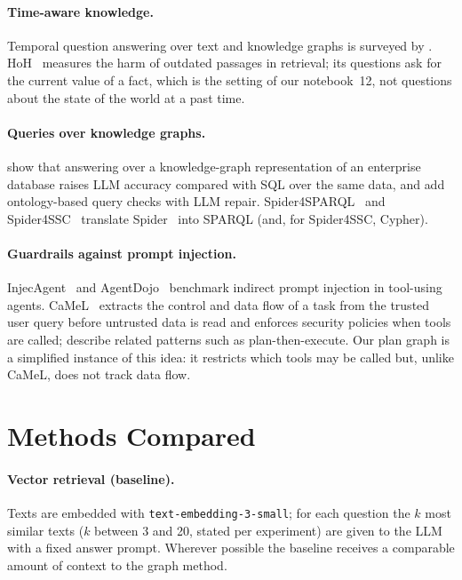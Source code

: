 \documentclass[11pt,a4paper]{article}
\begin{document}
\paragraph{Time-aware knowledge.} Temporal question answering over text and knowledge graphs is surveyed
by \citet{piryani2025temporalqa}. HoH~\cite{ouyang2025hoh} measures the harm of outdated passages in retrieval; its
questions ask for the current value of a fact, which is the setting of our notebook~12, not questions about the state
of the world at a past time.

\paragraph{Queries over knowledge graphs.} \citet{sequeda2023benchmark} show that answering over a knowledge-graph
representation of an enterprise database raises LLM accuracy compared with SQL over the same data, and
\citet{allemang2024ontologies} add ontology-based query checks with LLM repair. Spider4SPARQL~\cite{kosten2023spider4sparql}
and Spider4SSC~\cite{vejvar2025spider4ssc,vejvar2026singlequery} translate Spider~\cite{yu2018spider} into SPARQL
(and, for Spider4SSC, Cypher).

\paragraph{Guardrails against prompt injection.} InjecAgent~\cite{zhan2024injecagent} and AgentDojo~\cite{debenedetti2024agentdojo}
benchmark indirect prompt injection in tool-using agents. CaMeL~\cite{debenedetti2025camel} extracts the control and
data flow of a task from the trusted user query before untrusted data is read and enforces security policies when
tools are called; \citet{beurerkellner2025patterns} describe related patterns such as plan-then-execute. Our plan
graph is a simplified instance of this idea: it restricts which tools may be called but, unlike CaMeL, does not
track data flow.

\section{Methods Compared}
\label{sec:methods}

\paragraph{Vector retrieval (baseline).} Texts are embedded with \texttt{text-embedding-3-small}; for each
question the $k$ most similar texts ($k$ between 3 and 20, stated per experiment) are given to the LLM with a
fixed answer prompt. Wherever possible the baseline receives a comparable amount of context to the graph method.
\end{document}
